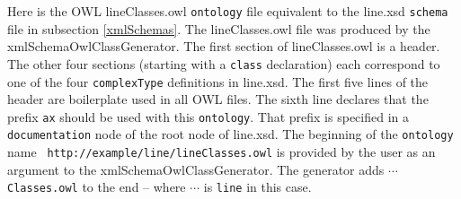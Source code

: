 \documentclass[preprint,12pt]{elsarticle}
\begin{document}
Here is the OWL lineClasses.owl {\tt ontology} file equivalent to the
line.xsd {\tt schema} file in subsection \ref{xmlSchemas}. The
lineClasses.owl file was produced by the xmlSchemaOwlClassGenerator. The
first section of lineClasses.owl is a header. The other four sections
(starting with a {\tt class} declaration) each correspond to one of the
four {\tt complexType} definitions in line.xsd. The first five lines of the
header are boilerplate used in all OWL files. The sixth line declares that
the prefix {\tt ax} should be used with this {\tt ontology}. That prefix is
specified in a {\tt documentation} node of the root node of line.xsd. The
beginning of the {\tt ontology} name {\tt
  http://example/line/lineClasses.owl} is provided by the user as an
argument to the xmlSchemaOwlClassGenerator. The generator adds $\cdots${\tt
  Classes.owl} to the end -- where $\cdots$ is {\tt line} in this case.
\end{document}
